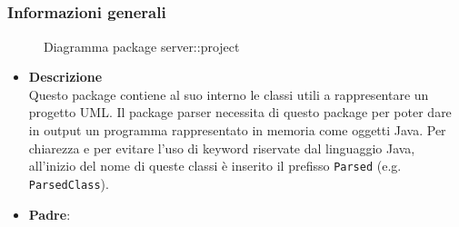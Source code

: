 \subsection{}
\label{\nogloxy{swedesigner::server::project}}
\subsubsection{Informazioni generali}
\begin{figure}[H]
	\caption{Diagramma package server::project}
\end{figure}
\begin{itemize}
\item \textbf{Descrizione}\\
Questo package contiene al suo interno le classi utili a rappresentare un progetto UML. Il package parser necessita di questo package per poter dare in output un programma rappresentato in memoria come oggetti Java. Per chiarezza e per evitare l'uso di keyword riservate dal linguaggio Java, all'inizio del nome di queste classi è inserito il prefisso \texttt{Parsed} (e.g. \texttt{ParsedClass}).
\item \textbf{Padre}: \hyperref[\nogloxy{swedesigner::server}]{}
\end{itemize}
